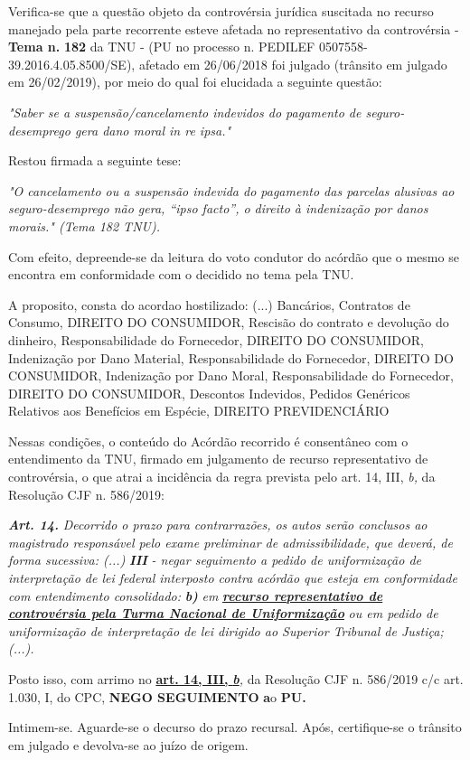 \documentclass[12pt]{article}
\begin{document}
\justifying
\noindent Verifica-se que a questão objeto da controvérsia jurídica suscitada no recurso manejado pela parte recorrente esteve afetada no representativo da controvérsia - \textbf{Tema n. }\textbf{182} da TNU - (PU no processo n. PEDILEF 0507558-39.2016.4.05.8500/SE),  afetado em 26/06/2018 foi julgado (trânsito em julgado em 26/02/2019), por meio do qual foi elucidada a seguinte questão:

\noindent \textit{"Saber se a suspensão/cancelamento indevidos do pagamento de seguro-desemprego gera dano moral in re ipsa."}

\noindent Restou firmada a seguinte tese:

\noindent \textit{"O cancelamento ou a suspensão indevida do pagamento das parcelas alusivas ao seguro-desemprego não gera, “ipso facto”, o direito à indenização por danos morais." (Tema 182 TNU).}

\noindent Com efeito, depreende-se da leitura do voto condutor do acórdão que o mesmo se encontra em conformidade com o decidido no  tema pela TNU.

\noindent A proposito, consta do acordao hostilizado: (...) Bancários, Contratos de Consumo, DIREITO DO CONSUMIDOR, Rescisão do contrato e devolução do dinheiro, Responsabilidade do Fornecedor, DIREITO DO CONSUMIDOR, Indenização por Dano Material, Responsabilidade do Fornecedor, DIREITO DO CONSUMIDOR, Indenização por Dano Moral, Responsabilidade do Fornecedor, DIREITO DO CONSUMIDOR, Descontos Indevidos, Pedidos Genéricos Relativos aos Benefícios em Espécie, DIREITO PREVIDENCIÁRIO

\noindent Nessas condições, o conteúdo do Acórdão recorrido é consentâneo com o entendimento da TNU, firmado em julgamento de recurso representativo de controvérsia, o que atrai a incidência da regra prevista pelo art. 14, III, \textit{b,} da Resolução CJF n. 586/2019:

\noindent \textit{\textbf{Art. 14.}}\textit{ Decorrido o prazo para contrarrazões, os autos serão conclusos ao magistrado responsável pelo exame preliminar de admissibilidade, que deverá, de forma sucessiva: (...) }\textit{\textbf{III }}\textit{- negar seguimento a pedido de uniformização de interpretação de lei federal interposto contra acórdão que esteja em conformidade com entendimento consolidado: }\textit{\textbf{b)}}\textit{ em }\uline{\textit{\textbf{recurso representativo de controvérsia pela Turma Nacional de Uniformização}}}\textit{ ou em pedido de uniformização de interpretação de lei dirigido ao Superior Tribunal de Justiça;(...).}

\noindent Posto isso, com arrimo no \uline{\textbf{art. 14, III, }}\uline{\textit{\textbf{b}}}\textit{,} da Resolução CJF n. 586/2019 c/c art. 1.030, I, do CPC, \textbf{NEGO SEGUIMENTO }\textbf{a}o\textbf{ PU}\textbf{.}

\noindent Intimem-se. Aguarde-se o decurso do prazo recursal. Após, certifique-se o trânsito em julgado e devolva-se ao juízo de origem.
\end{document}
